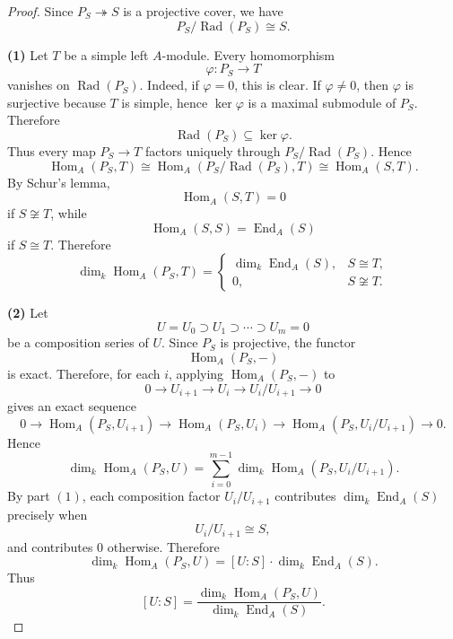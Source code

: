 \begin{proof}
    Since \(P_S\twoheadrightarrow S\) is a projective cover, we have
    \[
        P_S/\operatorname{Rad}(P_S)\cong S.
    \]

    \medskip

    \noindent
    \textbf{(1)}
    Let \(T\) be a simple left \(A\)-module. Every homomorphism
    \[
        \varphi:P_S\to T
    \]
    vanishes on \(\operatorname{Rad}(P_S)\). Indeed, if \(\varphi=0\), this is clear. If
    \(\varphi\neq 0\), then \(\varphi\) is surjective because \(T\) is simple, hence
    \(\ker\varphi\) is a maximal submodule of \(P_S\). Therefore
    \[
        \operatorname{Rad}(P_S)\subseteq \ker\varphi.
    \]
    Thus every map \(P_S\to T\) factors uniquely through
    \(P_S/\operatorname{Rad}(P_S)\). Hence
    \[
        \operatorname{Hom}_A(P_S,T)
        \cong
        \operatorname{Hom}_A(P_S/\operatorname{Rad}(P_S),T)
        \cong
        \operatorname{Hom}_A(S,T).
    \]
    By Schur's lemma,
    \[
        \operatorname{Hom}_A(S,T)=0
    \]
    if \(S\not\cong T\), while
    \[
        \operatorname{Hom}_A(S,S)=\operatorname{End}_A(S)
    \]
    if \(S\cong T\). Therefore
    \[
        \dim_k \operatorname{Hom}_A(P_S,T)
        =
        \begin{cases}
            \dim_k \operatorname{End}_A(S), & S\cong T,     \\
            0,                              & S\not\cong T.
        \end{cases}
    \]

    \medskip

    \noindent
    \textbf{(2)}
    Let
    \[
        U=U_0\supset U_1\supset \cdots \supset U_m=0
    \]
    be a composition series of \(U\). Since \(P_S\) is projective, the functor
    \[
        \operatorname{Hom}_A(P_S,-)
    \]
    is exact. Therefore, for each \(i\), applying \(\operatorname{Hom}_A(P_S,-)\) to
    \[
        0\longrightarrow U_{i+1}\longrightarrow U_i
        \longrightarrow U_i/U_{i+1}\longrightarrow 0
    \]
    gives an exact sequence
    \[
        0\longrightarrow
        \operatorname{Hom}_A(P_S,U_{i+1})
        \longrightarrow
        \operatorname{Hom}_A(P_S,U_i)
        \longrightarrow
        \operatorname{Hom}_A(P_S,U_i/U_{i+1})
        \longrightarrow 0.
    \]
    Hence
    \[
        \dim_k\operatorname{Hom}_A(P_S,U)
        =
        \sum_{i=0}^{m-1}
        \dim_k\operatorname{Hom}_A(P_S,U_i/U_{i+1}).
    \]
    By part \((1)\), each composition factor \(U_i/U_{i+1}\) contributes
    \(\dim_k\operatorname{End}_A(S)\) precisely when
    \[
        U_i/U_{i+1}\cong S,
    \]
    and contributes \(0\) otherwise. Therefore
    \[
        \dim_k\operatorname{Hom}_A(P_S,U)
        =
        [U:S]\cdot \dim_k\operatorname{End}_A(S).
    \]
    Thus
    \[
        [U:S]
        =
        \frac{\dim_k \operatorname{Hom}_A(P_S,U)}
        {\dim_k \operatorname{End}_A(S)}.
    \]


\end{proof}
